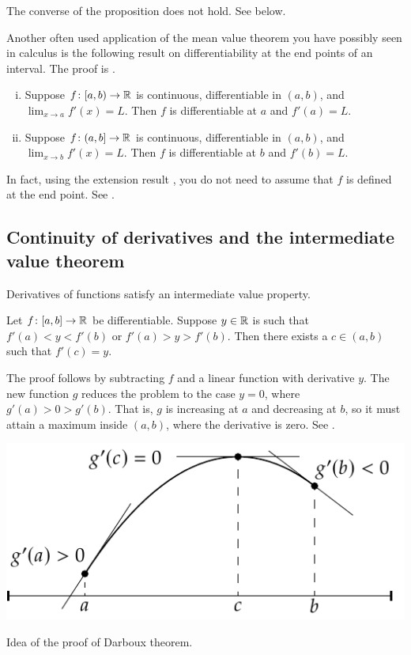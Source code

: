 The converse of the proposition does not hold.  See
 below.

\medskip

Another often used application of the mean value theorem you have possibly
seen in calculus is the following result on differentiability at the
end points of an interval.  The proof is
.

\begin{prop} \label{prop:endpointderivative}
\leavevmode
\begin{enumerate}[(i)]
\item
Suppose $f \colon [a,b) \to {\mathbb{R}}$ is continuous, differentiable in $(a,b)$,
and $\lim_{x \to a} f'(x) = L$.  Then $f$ is differentiable at $a$ and
$f'(a) = L$.
\item
Suppose $f \colon (a,b] \to {\mathbb{R}}$ is continuous, differentiable in $(a,b)$,
and $\lim_{x \to b} f'(x) = L$.  Then $f$ is differentiable at $b$ and
$f'(b) = L$.
\end{enumerate}
\end{prop}

In fact, using the extension result , you do not need to assume
that $f$ is defined at the end point.  See .

\subsection{Continuity of derivatives and the intermediate value theorem}

Derivatives of functions satisfy an
intermediate value property.

\begin{thm}[Darboux] \label{thm:darboux} 
Let $f \colon [a,b] \to {\mathbb{R}}$ be differentiable.  Suppose $y \in {\mathbb{R}}$ is such
that $f'(a) < y < f'(b)$ or
$f'(a) > y > f'(b)$.  Then there exists a $c \in (a,b)$ such that $f'(c) =
y$.
\end{thm}

The proof follows by subtracting $f$ and a linear function with derivative
$y$.  The new function $g$ reduces the problem
to the case $y=0$, where $g'(a) > 0 > g'(b)$.  That is, $g$ is increasing at $a$ and
decreasing at $b$, so it must attain a maximum inside $(a,b)$,
where the derivative is zero.  See .

\begin{myfigureht}
\includegraphics{figures/darbouxthmfig}
\caption{Idea of the proof of Darboux theorem.\label{darbouxthmfig}}
\end{myfigureht}


